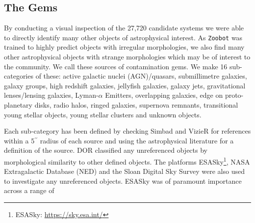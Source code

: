 {\subsection{The Gems}\label{gems}
\noindent By conducting a visual inspection of the 27,720 candidate systems we were able to directly identify many other objects of astrophysical interest. As \texttt{Zoobot} was trained to highly predict objects with irregular morphologies, we also find many other astrophysical objects with strange morphologies which may be of interest to the community. We call these sources of contamination gems. We make 16 sub-categories of these: active galactic nuclei (AGN)/quasars, submillimetre galaxies, galaxy groups, high redshift galaxies, jellyfish galaxies, galaxy jets, gravitational lenses/lensing galaxies, Lyman-$\alpha$ Emitters, overlapping galaxies, edge on proto-planetary disks, radio halos, ringed galaxies, supernova remnants, transitional young stellar objects, young stellar clusters and unknown objects. 

Each sub-category has been defined by checking Simbad and VizieR for references within a 5$^{\prime \prime}$ radius of each source and using the astrophysical literature for a definition of the source. DOR classified any unreferenced objects by morphological similarity to other defined objects. The platforms ESASky\footnote{ESASky: \url{https://sky.esa.int/}}\citep{2017arXiv171204114M}, NASA Extragalactic Database (NED) and the Sloan Digital Sky Survey were also used to investigate any unreferenced objects. ESASky was of paramount importance \DIFdelbegin {}\DIFdelend \DIFaddbegin {}\DIFaddend across a range of \DIFdelbegin {}\DIFdelend \DIFaddbegin {}\textit{} \textit{} \DIFaddend 

}
